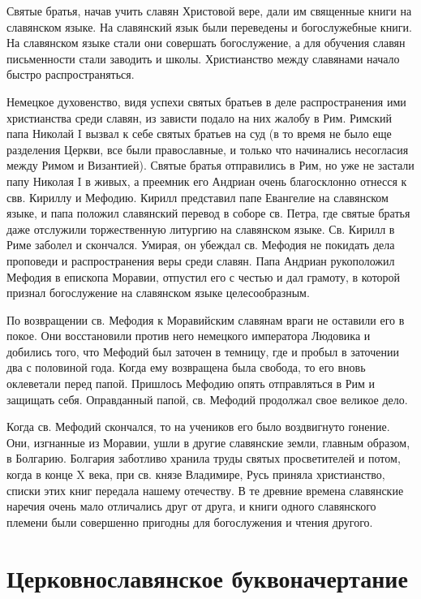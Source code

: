 \documentclass[11pt,a4paper,oneside]{memoir}
\begin{document}
    Святые братья, начав учить славян Христовой вере, дали им священные книги на славянском языке. На славянский язык были переведены и богослужебные книги. На славянском языке стали они совершать богослужение, а для обучения славян письменности стали заводить и школы. Христианство между славянами начало быстро распространяться.

    Немецкое духовенство, видя успехи святых братьев в деле распространения ими христианства среди славян, из зависти подало на них жалобу в Рим. Римский папа Николай I вызвал к себе святых братьев на суд (в то время не было еще разделения Церкви, все были православные, и только что начинались несогласия между Римом и Византией). Святые братья отправились в Рим, но уже не застали папу Николая I в живых, а преемник его Андриан очень благосклонно отнесся к свв. Кириллу и Мефодию. Кирилл представил папе Евангелие на славянском языке, и папа положил славянский перевод в соборе св. Петра, где святые братья даже отслужили торжественную литургию на славянском языке. Св. Кирилл в Риме заболел и скончался. Умирая, он убеждал св. Мефодия не покидать дела проповеди и распространения веры среди славян. Папа Андриан рукоположил Мефодия в епископа Моравии, отпустил его с честью и дал грамоту, в которой признал богослужение на славянском языке целесообразным.

    По возвращении св. Мефодия к Моравийским славянам враги не оставили его в покое. Они восстановили против него немецкого императора Людовика и добились того, что Мефодий был заточен в темницу, где и пробыл в заточении два с половиной года. Когда ему возвращена была свобода, то его вновь оклеветали перед папой. Пришлось Мефодию опять отправляться в Рим и защищать себя. Оправданный папой, св. Мефодий продолжал свое великое дело.

    Когда св. Мефодий скончался, то на учеников его было воздвигнуто гонение. Они, изгнанные из Моравии, ушли в другие славянские земли, главным образом, в Болгарию. Болгария заботливо хранила труды святых просветителей и потом, когда в конце X века, при св. князе Владимире, Русь приняла христианство, списки этих книг передала нашему отечеству. В те древние времена славянские наречия очень мало отличались друг от друга, и книги одного славянского племени были совершенно пригодны для богослужения и чтения другого.


        \section{Церковнославянское буквоначертание}
\end{document}
